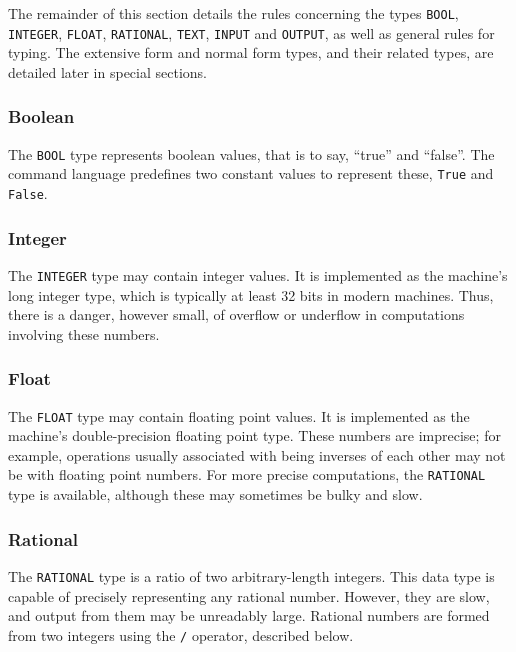 \medskip

The remainder of this section details the rules concerning the types
{\tt BOOL}, {\tt INTEGER}, {\tt FLOAT}, {\tt RATIONAL}, {\tt TEXT},
{\tt INPUT} and {\tt OUTPUT}, as well as general rules for typing.
The extensive form and normal form types, and their related types, are
detailed later in special sections.

\subsubsection{Boolean}

The {\tt BOOL} type represents boolean values, that is to say, ``true'' and
``false''.  The command language predefines two constant values to
represent these, {\tt True} and {\tt False}.

\subsubsection{Integer}

The {\tt INTEGER} type may contain integer values.  It is implemented
as the machine's long integer type, which is typically at least 32
bits in modern machines.  Thus, there is a danger, however small, of
overflow or underflow in computations involving these numbers.

\subsubsection{Float}

The {\tt FLOAT} type may contain floating point values.  It is implemented
as the machine's double-precision floating point type.  These numbers
are imprecise; for example, operations usually associated with being inverses
of each other may not be with floating point numbers.  For more precise
computations, the {\tt RATIONAL} type is available, although these may
sometimes be bulky and slow.

\subsubsection{Rational}

The {\tt RATIONAL} type is a ratio of two arbitrary-length integers.
This data type is capable of precisely representing any rational
number.  However, they are slow, and output from them may be
unreadably large.  Rational numbers are formed from two integers using
the {\tt /} operator, described below.

